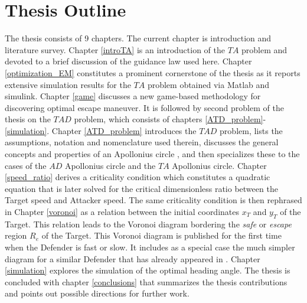 \section{Thesis Outline}
The thesis consists of 9 chapters. The current chapter is introduction and literature survey. Chapter \ref{introTA} is an introduction of the $ TA $ problem and  devoted to a brief discussion of the guidance law used here. Chapter \ref{optimization_EM} constitutes a prominent cornerstone of the thesis as it reports extensive simulation results for the $ TA $ problem obtained via Matlab and simulink. Chapter \ref{game} discusses a new game-based methodology for discovering optimal escape maneuver. It is followed by second problem of the thesis on the $ TAD $ problem, which consists of chapters \ref{ATD_problem}-\ref{simulation}. Chapter \ref{ATD_problem} introduces the $ TAD $ problem, lists the assumptions, notation and nomenclature used therein, discusses the general concepts and properties of an Apollonius circle \cite{ayoub2003proving,ayoub2006circle,partensky2008circle,fulton2015conflict}, and then specializes these to the cases of the $AD$ Apollonius circle and the $TA$ Apollonius circle. Chapter \ref{speed_ratio} derives a criticality condition which constitutes a quadratic equation that is later solved for the critical dimensionless ratio between the Target speed and Attacker speed. The same criticality condition is then rephrased in Chapter \ref{voronoi} as a relation between the initial coordinates $x_T$ and $y_T$ of the Target. This relation leads to the Voronoi diagram bordering the \textit{safe} or \textit{escape} region $R_e$ of the Target. This Voronoi diagram is published for the first time when the Defender is fast or slow. It includes as a special case the much simpler diagram for a similar Defender that has already appeared in \cite{garcia2015escape}. Chapter \ref{simulation} explores the simulation of the optimal heading angle. The thesis is concluded with chapter \ref{conclusions} that summarizes the thesis contributions and points out possible directions for further work. 


